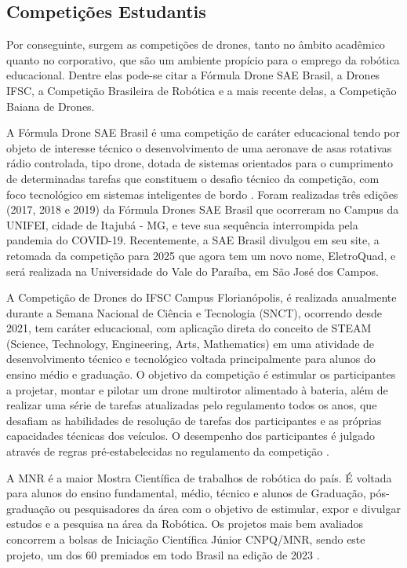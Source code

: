 \documentclass[conference]{IEEEtran}
\begin{document}
\subsection{Competições Estudantis}

Por conseguinte, surgem as competições de drones, tanto no âmbito acadêmico quanto no corporativo, que são um ambiente propício para o emprego da robótica educacional. Dentre elas pode-se citar a Fórmula Drone SAE Brasil,  a Drones IFSC, a Competição Brasileira de Robótica e a mais recente delas, a Competição Baiana de Drones.

A Fórmula Drone SAE Brasil é uma competição de caráter educacional tendo por objeto de interesse técnico o desenvolvimento de uma aeronave de asas rotativas rádio controlada, tipo drone, dotada de sistemas orientados para o cumprimento de determinadas tarefas que constituem o desafio técnico da competição, com foco tecnológico em sistemas inteligentes de bordo \cite{b7}. Foram realizadas três edições (2017, 2018 e 2019) da Fórmula Drones SAE Brasil que ocorreram no Campus da UNIFEI, cidade de Itajubá - MG, e teve sua sequência interrompida pela pandemia do COVID-19. Recentemente, a SAE Brasil divulgou em seu site, a retomada da competição para 2025 que agora tem um novo nome, EletroQuad, e será realizada na Universidade do Vale do Paraíba, em São José dos Campos.

A Competição de Drones do IFSC Campus Florianópolis, é realizada anualmente durante a Semana Nacional de Ciência e Tecnologia (SNCT), ocorrendo desde 2021, tem caráter educacional, com aplicação direta do conceito de STEAM (Science, Technology, Engineering, Arts, Mathematics) em uma atividade de desenvolvimento técnico e tecnológico voltada principalmente para alunos do ensino médio e graduação. O objetivo da competição é estimular os participantes a projetar, montar e pilotar um drone multirotor alimentado à bateria, além de realizar uma série de tarefas atualizadas pelo regulamento todos os anos, que desafiam as habilidades de resolução de tarefas dos participantes e as próprias capacidades técnicas dos veículos. O desempenho dos participantes é julgado através de regras pré-estabelecidas no regulamento da competição \cite{b4}.

A MNR é a maior Mostra Científica de trabalhos de robótica do país. É voltada para alunos do ensino fundamental, médio, técnico e alunos de Graduação, pós-graduação ou pesquisadores da área com o objetivo de estimular, expor e divulgar estudos e a pesquisa na área da Robótica. Os projetos mais bem avaliados concorrem a bolsas de Iniciação Científica Júnior CNPQ/MNR, sendo este projeto, um dos 60 premiados em todo Brasil na edição de 2023 \cite{b5}.
\end{document}

